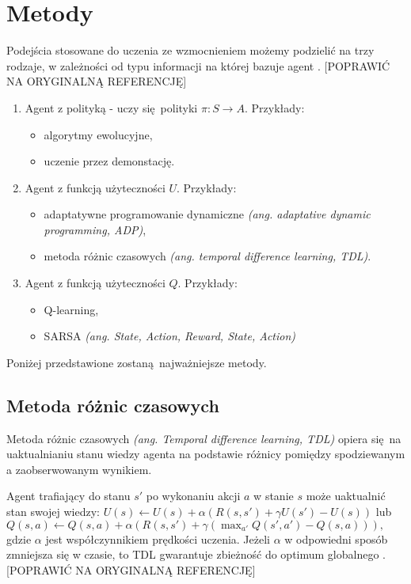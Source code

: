 \section{Metody}\label{methods}

Podejścia stosowane do uczenia ze wzmocnieniem możemy podzielić na trzy rodzaje, w zależności od typu informacji na której bazuje agent \cite{wjaskowski2016}. [POPRAWIĆ NA ORYGINALNĄ REFERENCJĘ]

\begin{enumerate}
\item Agent z polityką - uczy się polityki  $\pi: S \rightarrow A$. Przykłady:
\begin{itemize}
\item algorytmy ewolucyjne,
\item uczenie przez demonstację.
\end{itemize}
\item Agent z funkcją użyteczności $U$. Przykłady:
\begin{itemize}
\item adaptatywne programowanie dynamiczne \textit{(ang. adaptative dynamic programming, ADP)},
\item metoda różnic czasowych \textit{(ang. temporal difference learning, TDL)}.
\end{itemize}
\item Agent z funkcją użyteczności $Q$. Przykłady:
\begin{itemize}
\item Q-learning,
\item SARSA \textit{(ang. State, Action, Reward, State, Action)}
\end{itemize}
\end{enumerate}

Poniżej przedstawione zostaną najważniejsze metody.

\subsection{Metoda różnic czasowych}\label{tdl}

Metoda różnic czasowych \textit{(ang. Temporal difference learning, TDL)} \cite{Sutton:1988:LPM:637912.637937} opiera się na uaktualnianiu stanu wiedzy agenta na podstawie różnicy pomiędzy spodziewanym a zaobserwowanym wynikiem.

Agent trafiający do stanu $s'$ po wykonaniu akcji $a$ w stanie $s$ może uaktualnić stan swojej wiedzy: $U(s) \leftarrow U(s) + \alpha (R(s,s') + \gamma U(s') - U (s))$ lub $Q(s,a) \leftarrow Q(s,a) + \alpha (R(s,s') + \gamma (\max_{a'}Q(s',a') - Q (s,a))),$ gdzie $\alpha$ jest współczynnikiem prędkości uczenia. Jeżeli $\alpha$ w odpowiedni sposób zmniejsza się w czasie, to TDL gwarantuje zbieżność do optimum globalnego \cite{wjaskowski2016}.[POPRAWIĆ NA ORYGINALNĄ REFERENCJĘ]

